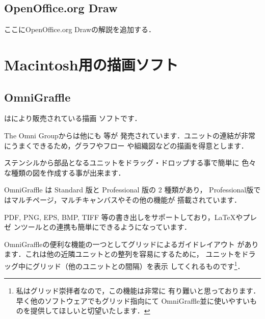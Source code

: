 \subsection{OpenOffice.org Draw}

\begin{append}
 ここにOpenOffice.org Drawの解説を追加する．
\end{append}


\section{Macintosh用の描画ソフト}



\subsection{OmniGraffle}

はにより販売されている描画
ソフトです．


The Omni Groupからは他にも 等が
発売されています．ユニットの連結が非常にうまくできるため，グラフやフロー
や組織図などの描画を得意とします．

ステンシルから部品となるユニットをドラッグ・ドロップする事で簡単に
色々な種類の図を作成する事が出来ます．

OmniGraffle は Standard 版と Professional 版の 2 種類があり，
Professional版ではマルチページ，マルチキャンバスやその他の機能が
搭載されています．

PDF, PNG, EPS, BMP, TIFF 等の書き出しをサポートしており，\LaTeX やプレゼ
ンツールとの連携も簡単にできるようになっています．


OmniGraffleの便利な機能の一つとしてグリッドによるガイドレイアウト
があります．これは他の近隣ユニットとの整列を容易にするために，
ユニットをドラッグ中にグリッド（他のユニットとの間隔）を表示
してくれるものです\footnote{私はグリッド崇拝者なので，この機能は非常に
有り難いと思っております．早く他のソフトウェアでもグリッド指向にて
OmniGraffle並に使いやすいものを提供してほしいと切望いたします．}．

